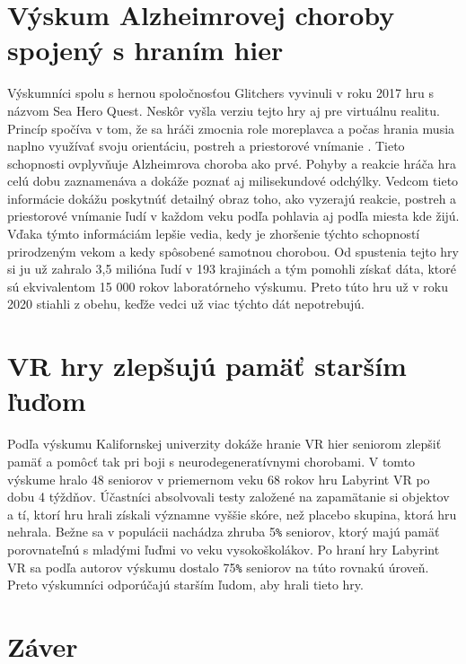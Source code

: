 \documentclass[10pt,twoside,slovak,a4paper]{article}
\begin{document}
\section{Výskum Alzheimrovej choroby spojený s hraním hier} \label{vyskum_v_domove_dochodcov}
Výskumníci spolu s hernou spoločnosťou Glitchers  vyvinuli v roku 2017 hru s názvom Sea Hero Quest\cite{Spiers2021ExplainingWV:SeaHeroQuest}. Neskôr vyšla verziu tejto hry aj pre virtuálnu realitu. Princíp spočíva v tom, že sa hráči zmocnia role moreplavca a počas hrania musia naplno využívať svoju orientáciu, postreh a priestorové vnímanie \cite{Virualizing:Conference}. Tieto schopnosti ovplyvňuje Alzheimrova choroba ako prvé. Pohyby a reakcie hráča hra celú dobu zaznamenáva a dokáže poznať aj milisekundové odchýlky. Vedcom tieto informácie dokážu poskytnúť detailný obraz toho, ako vyzerajú reakcie, postreh a priestorové vnímanie ľudí v každom veku podľa pohlavia aj podľa miesta kde žijú. Vďaka týmto informáciám lepšie vedia, kedy je zhoršenie týchto schopností prirodzeným vekom a kedy spôsobené samotnou chorobou. Od spustenia tejto hry si ju už zahralo 3,5 milióna ľudí v 193 krajinách a tým pomohli získať dáta, ktoré sú ekvivalentom 15 000 rokov laboratórneho výskumu. Preto túto hru už v roku 2020 stiahli z obehu, keďže vedci už viac týchto dát nepotrebujú.


\section{VR hry zlepšujú pamäť starším ľuďom} \label{vr_hry_zlepsuju_pamat}
Podľa výskumu Kalifornskej univerzity dokáže hranie VR hier seniorom zlepšiť pamäť a pomôcť tak pri boji s neurodegeneratívnymi chorobami. V tomto výskume hralo 48 seniorov v priemernom veku 68 rokov hru Labyrint VR po dobu 4 týždňov. Účastníci absolvovali testy založené na zapamätanie si objektov a tí, ktorí hru hrali získali významne vyššie skóre, než placebo skupina, ktorá hru nehrala. Bežne sa v populácii nachádza zhruba 5\texttt{\%} seniorov, ktorý majú pamäť porovnateľnú s mladými ľuďmi vo veku vysokoškolákov. Po hraní hry Labyrint VR sa podľa autorov výskumu dostalo 75\texttt{\%} seniorov na túto rovnakú úroveň. Preto výskumníci odporúčajú starším ľudom, aby hrali tieto hry.













\section{Záver} \label{zaver} %






\end{document}
